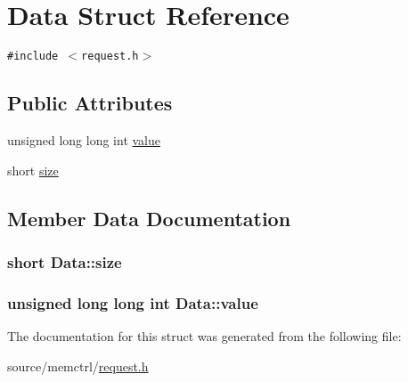 \hypertarget{structData}{
\section{Data Struct Reference}
\label{structData}
}
{\tt \#include $<$request.h$>$}

\subsection*{Public Attributes}
\begin{CompactItemize}
\item 
unsigned long long int \hyperlink{structData_be8f049430369f7682bcee5a12072b4f}{value}
\item 
short \hyperlink{structData_3c66751e9b4f4968ad69df84c7922422}{size}
\end{CompactItemize}


\subsection{Member Data Documentation}
\hypertarget{structData_3c66751e9b4f4968ad69df84c7922422}{
\subsubsection[{size}]{\setlength{\rightskip}{0pt plus 5cm}short {\bf Data::size}}}
\label{structData_3c66751e9b4f4968ad69df84c7922422}


\hypertarget{structData_be8f049430369f7682bcee5a12072b4f}{
\subsubsection[{value}]{\setlength{\rightskip}{0pt plus 5cm}unsigned long long int {\bf Data::value}}}
\label{structData_be8f049430369f7682bcee5a12072b4f}




The documentation for this struct was generated from the following file:\begin{CompactItemize}
\item 
source/memctrl/\hyperlink{request_8h}{request.h}\end{CompactItemize}
